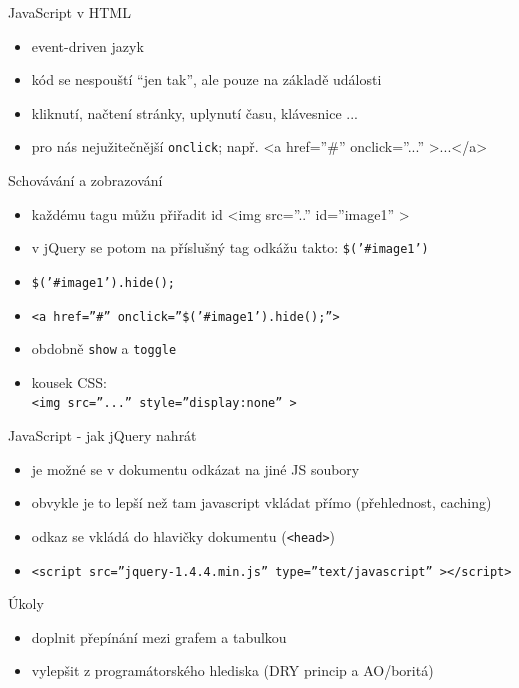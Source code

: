 \documentclass{beamer}
\begin{document}
\begin{frame}{JavaScript v HTML}
  \begin{itemize}
    \item event-driven jazyk
    \item kód se nespouští ``jen tak'', ale pouze na základě události
    \item kliknutí, načtení stránky, uplynutí času, klávesnice ...
    \item pro nás nejužitečnější \texttt{onclick}; např. <a href=''\#'' onclick=''...'' >...</a>
  \end{itemize}
\end{frame}

\begin{frame}{Schovávání a zobrazování}
  \begin{itemize}
    \item každému tagu můžu přiřadit id <img src=''..'' id=''image1'' >
    \item v jQuery se potom na příslušný tag odkážu takto: \texttt{\$('\#image1')}
    \item \texttt{\$('\#image1').hide();}
    \item \texttt{<a href=''\#'' onclick=''\$('\#image1').hide();''>}
    \item obdobně \texttt{show} a \texttt{toggle}
    \item kousek CSS: \\ \texttt{<img src=''...'' style=''display:none'' >}
  \end{itemize}
\end{frame}

\begin{frame}{JavaScript - jak jQuery nahrát}
  \begin{itemize}
    \item je možné se v dokumentu odkázat na jiné JS soubory
    \item obvykle je to lepší než tam javascript vkládat přímo (přehlednost, caching)
    \item odkaz se vkládá do hlavičky dokumentu (\texttt{<head>})
    \item \texttt{<script src=''jquery-1.4.4.min.js'' type=''text/javascript'' ></script>}
  \end{itemize}
\end{frame}

\begin{frame}{Úkoly}
  \begin{itemize}
    \item doplnit přepínání mezi grafem a tabulkou
    \item vylepšit z programátorského hlediska (DRY princip a AO/boritá)
  \end{itemize}
\end{frame}
\end{document}
